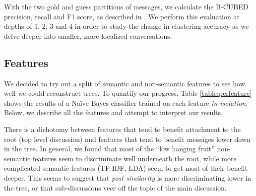 \documentclass{article}
\begin{document}
With the two gold and guess partitions of messages, we calculate the B-CUBED
precision, recall and F1 score, as described in . We perform
this evaluation at depths of 1, 2, 3 and 4 in order to study the change in
clustering accuracy as we delve deeper into smaller, more localized
conversations.

\subsection{Features}
\label{sec:features}
We decided to try out a split of semantic and non-semantic features to see how
well we could reconstruct trees. To quantify our progress, Table
\ref{table:perfeature} shows the results of a Naïve Bayes classifier trained on
each feature \textit{in isolation}. Below, we describe all the features and
attempt to interpret our results. 

There is a dichotomy between features that tend to benefit attachment to the
root (top level discussion) and features that tend to benefit messages lower
down in the tree. In general, we found that most of the ``low hanging fruit''
non-semantic features seem to discriminate well underneath the root, while
more complicated semantic features (TF-IDF, LDA) seem to get most of their
benefit deeper. This seems to suggest that \textit{post similarity} is more
discriminating lower in the tree, or that sub-discussions veer off the topic
of the main discussion.
\end{document}

